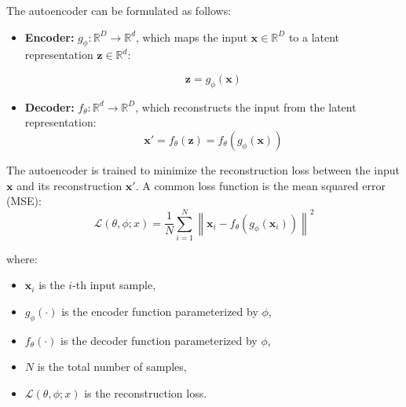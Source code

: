\documentclass{article}
\begin{document}
The autoencoder can be formulated as follows:
\begin{itemize}
  \item \textbf{Encoder:} \( g_{\phi}: \mathbb{R}^D \rightarrow \mathbb{R}^d \), which maps the input \( \mathbf{x} \in \mathbb{R}^D \) to a latent representation \( \mathbf{z} \in \mathbb{R}^d \):
  
  \begin{equation}
      \mathbf{z} = g_{\phi}(\mathbf{x})
  \end{equation}
  
  \item \textbf{Decoder:} \( f_{\theta}: \mathbb{R}^d \rightarrow \mathbb{R}^D \), which reconstructs the input from the latent representation:
  \begin{equation}
    \mathbf{x}' = f_{\theta}(\mathbf{z}) = f_{\theta}(g_{\phi}(\mathbf{x}))
  \end{equation}
\end{itemize}


The autoencoder is trained to minimize the reconstruction loss between the input \( \mathbf{x} \) and its reconstruction \( \mathbf{x}' \). A common loss function is the mean squared error (MSE):
\begin{equation}
    \mathcal{L}(\theta,\phi;x) = \frac{1}{N} \sum_{i=1}^N \left\| \mathbf{x}_i - f_{\theta}(g_{\phi}(\mathbf{x}_i)) \right\|^2
\end{equation}

where:
\begin{itemize}
    \item \( \mathbf{x}_i \) is the \(i\)-th input sample,
    \item \( g_{\phi}(\cdot) \) is the encoder function parameterized by \(\phi\),
    \item \( f_{\theta}(\cdot) \) is the decoder function parameterized by \(\phi\),
    \item \( N \) is the total number of samples,
    \item \( \mathcal{L}(\theta,\phi;x) \) is the reconstruction loss.
\end{itemize}
\end{document}
